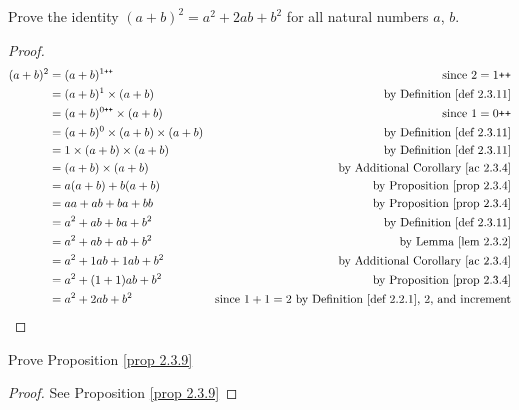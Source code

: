 \begin{exercise}\label{exercise 2.3.4}
Prove the identity \((a + b)^2 = a^2 + 2ab + b^2\) for all natural numbers \(a\), \(b\).
\end{exercise}
\begin{proof}
\begin{align*}
    (a + b)^2 & = (a + b)^{1\texttt{++}} & \text{since \(2 = 1\texttt{++}\)} \\
              & = (a + b)^1 \times (a + b) & \text{by Definition \ref{def 2.3.11}} \\
              & = (a + b)^{0\texttt{++}} \times (a + b) & \text{since \(1 = 0\texttt{++}\)} \\
              & = (a + b)^0 \times (a + b) \times (a + b) & \text{by Definition \ref{def 2.3.11}} \\
              & = 1 \times (a + b) \times (a + b) & \text{by Definition \ref{def 2.3.11}} \\
              & = (a + b) \times (a + b) & \text{by Additional Corollary \ref{ac 2.3.4}} \\
              & = a(a + b) + b(a + b) & \text{by Proposition \ref{prop 2.3.4}} \\
              & = aa + ab + ba + bb & \text{by Proposition \ref{prop 2.3.4}} \\
              & = a^2 + ab + ba + b^2 & \text{by Definition \ref{def 2.3.11}} \\
              & = a^2 + ab + ab + b^2 & \text{by Lemma \ref{lem 2.3.2}} \\
              & = a^2 + 1ab + 1ab + b^2 & \text{by Additional Corollary \ref{ac 2.3.4}} \\
              & = a^2 + (1 + 1)ab + b^2 & \text{by Proposition \ref{prop 2.3.4}} \\
              & = a^2 + 2ab + b^2 & \text{since \(1 + 1 = 2\) by Definition \ref{def 2.2.1}, \(2\), and increment}
\end{align*}
\end{proof}

\begin{exercise}\label{exercise 2.3.5}
    Prove Proposition \ref{prop 2.3.9}
\end{exercise}
\begin{proof}
    See Proposition \ref{prop 2.3.9}
\end{proof}